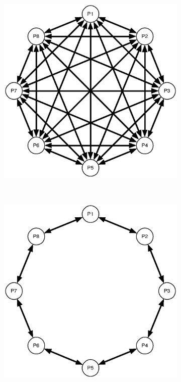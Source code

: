 \documentclass{csfourzero}
\begin{document}
\begin{figure}
  \centering
  \begin{subfigure}[b]{0.3\textwidth}
    \includegraphics[width=\textwidth]{global_best_topology.eps}
    \label{fig:global_best_topology}
  \end{subfigure}
  ~
  \begin{subfigure}[b]{0.3\textwidth}
    \includegraphics[width=\textwidth]{ring_topology.eps}

\end{subfigure}
\end{figure}
\end{document}
